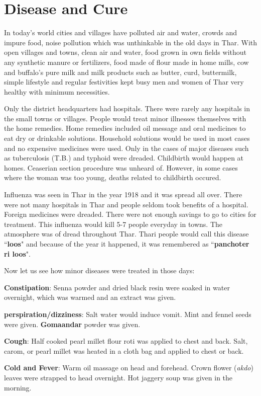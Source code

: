 \chapter{Disease and Cure}
In today's world cities and villages have polluted air and water, crowds and
impure food, noise pollution which was unthinkable in the old days in Thar.
With open villages and towns, clean air and water, food grown in own fields
without any synthetic manure or fertilizers, food made of flour made in home
mills, cow and buffalo's pure milk and milk products such as butter, curd,
buttermilk, simple lifestyle and regular festivities kept busy men and women of
Thar very healthy with minimum necessities.

Only the district headquarters had hospitals. There were rarely any hospitals
in the small towns or villages. People would treat minor illnesses themselves
with the home remedies. Home remedies included oil message and oral medicines
to eat dry or drinkable solutions. Household solutions would be used in most
cases and no expensive medicines were used. Only in the cases of major diseases
such as tuberculosis (T.B.) and typhoid were dreaded. Childbirth would happen
at homes. Ceaserian section procedure was unheard of. However, in some cases
where the woman was too young, deaths related to childbirth occured.

Influenza was seen in Thar in the year 1918 and it was spread all over. There
were not many hospitals in Thar and people seldom took benefits of a hospital.
Foreign medicines were dreaded. There were not enough savings to go to cities
for treatment. This influenza would kill 5-7 people everyday in towns. The
    atmosphere was of dread throughout Thar. Thari people would call this
    disease ``\textbf{loos}" and because of the year it happened, it was
    remembered as ``\textbf{panchoter ri loos}". 

Now let us see how minor diseases were treated in those days:

\textbf{Constipation}: Senna powder and dried black resin were soaked in water
overnight, which was warmed and an extract was given.

\textbf{perspiration/dizziness}: Salt water would induce vomit. Mint and fennel
seeds were given. \textbf{Gomaandar} powder was given.

\textbf{Cough}: Half cooked pearl millet flour roti was applied to chest and
back. Salt, carom, or pearl millet was heated in a cloth bag and applied to
chest or back.

\textbf{Cold and Fever}: Warm oil massage on head and forehead. Crown flower
(\textit{akdo}) leaves were strapped to head overnight. Hot jaggery soup was
given in the morning.

